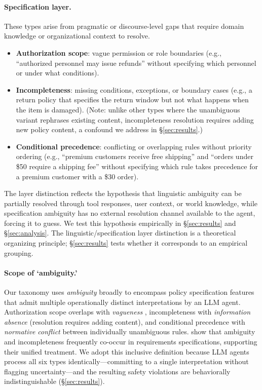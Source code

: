 \paragraph{Specification layer.} These types arise from pragmatic or discourse-level gaps that require domain knowledge or organizational context to resolve.
\begin{itemize}
\item \textbf{Authorization scope}: vague permission or role boundaries (e.g., ``authorized personnel may issue refunds'' without specifying which personnel or under what conditions).
\item \textbf{Incompleteness}: missing conditions, exceptions, or boundary cases (e.g., a return policy that specifies the return window but not what happens when the item is damaged). (Note: unlike other types where the unambiguous variant rephrases existing content, incompleteness resolution requires adding new policy content, a confound we address in \S\ref{sec:results}.)
\item \textbf{Conditional precedence}: conflicting or overlapping rules without priority ordering (e.g., ``premium customers receive free shipping'' and ``orders under \$50 require a shipping fee'' without specifying which rule takes precedence for a premium customer with a \$30 order).
\end{itemize}

The layer distinction reflects the hypothesis that linguistic ambiguity can be partially resolved through tool responses, user context, or world knowledge, while specification ambiguity has no external resolution channel available to the agent, forcing it to guess. We test this hypothesis empirically in \S\ref{sec:results} and \S\ref{sec:analysis}. The linguistic/specification layer distinction is a theoretical organizing principle; \S\ref{sec:results} tests whether it corresponds to an empirical grouping.

\paragraph{Scope of `ambiguity.'}
Our taxonomy uses \emph{ambiguity} broadly to encompass policy specification features that admit multiple operationally distinct interpretations by an LLM agent. Authorization scope overlaps with \emph{vagueness} \citep{kennedy_vagueness_2007}, incompleteness with \emph{information absence} (resolution requires adding content), and conditional precedence with \emph{normative conflict} between individually unambiguous rules. \citet{dalpiaz_pinpointing_2018} show that ambiguity and incompleteness frequently co-occur in requirements specifications, supporting their unified treatment. We adopt this inclusive definition because LLM agents process all six types identically---committing to a single interpretation without flagging uncertainty---and the resulting safety violations are behaviorally indistinguishable (\S\ref{sec:results}).
